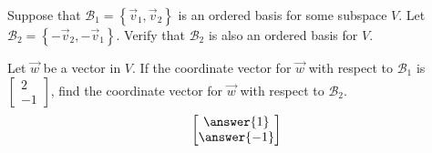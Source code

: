 \documentclass{ximera}
\author{}
\begin{document}
\begin{exercise}
Suppose that $\mathcal{B}_1=\left\{\vec{v}_1, \vec{v}_2\right\}$ is an ordered basis for some subspace $V$.  Let $\mathcal{B}_2=\left\{-\vec{v}_2, -\vec{v}_1\right\}$.  Verify that $\mathcal{B}_2$ is also an ordered basis for $V$.

Let $\vec{w}$ be a vector in $V$.  If the coordinate vector for $\vec{w}$ with respect to $\mathcal{B}_1$ is $\begin{bmatrix}2\\-1\end{bmatrix}$, find the coordinate vector for $\vec{w}$ with respect to $\mathcal{B}_2$.
$$\begin{bmatrix}\answer{1}\\\answer{-1}\end{bmatrix}$$

\end{exercise}
\end{document}
